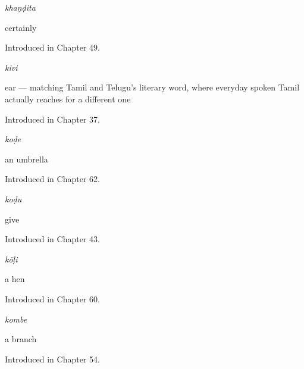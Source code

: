 \noindent\begin{minipage}[t]{\linewidth}
\raggedright
\textbf{}\enspace\emph{khaṇḍita}\par
\small certainly\par
\footnotesize Introduced in Chapter 49.
\end{minipage}\par\medskip

\noindent\begin{minipage}[t]{\linewidth}
\raggedright
\textbf{}\enspace\emph{kivi}\par
\small ear — matching Tamil and Telugu's literary word, where everyday spoken Tamil actually reaches for a different one\par
\footnotesize Introduced in Chapter 37.
\end{minipage}\par\medskip

\noindent\begin{minipage}[t]{\linewidth}
\raggedright
\textbf{}\enspace\emph{koḍe}\par
\small an umbrella\par
\footnotesize Introduced in Chapter 62.
\end{minipage}\par\medskip

\noindent\begin{minipage}[t]{\linewidth}
\raggedright
\textbf{}\enspace\emph{koḍu}\par
\small give\par
\footnotesize Introduced in Chapter 43.
\end{minipage}\par\medskip

\noindent\begin{minipage}[t]{\linewidth}
\raggedright
\textbf{}\enspace\emph{kōḷi}\par
\small a hen\par
\footnotesize Introduced in Chapter 60.
\end{minipage}\par\medskip

\noindent\begin{minipage}[t]{\linewidth}
\raggedright
\textbf{}\enspace\emph{kombe}\par
\small a branch\par
\footnotesize Introduced in Chapter 54.
\end{minipage}\par\medskip

